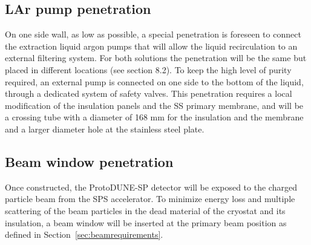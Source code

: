 \subsection{LAr pump penetration}

On one side wall, as low as possible, a special penetration is foreseen to connect the extraction liquid argon pumps that will allow the liquid recirculation to an external filtering system. For both solutions the penetration will be the same but placed in different locations (see section 8.2).
To keep the high level of purity required, an external pump is connected on one side to the bottom of the liquid, through a dedicated system of safety valves. This penetration requires a local modification of the insulation panels and the SS primary membrane, and will be a crossing tube with a diameter of 168 mm for the insulation and the membrane and a larger diameter hole at the stainless steel plate.

\subsection{Beam window penetration}
\label{subsec:beamwindow}
Once constructed, the ProtoDUNE-SP detector will be exposed to the charged
particle beam from the SPS accelerator. To minimize energy loss and
multiple scattering of the beam particles in the dead material of the
cryostat and its insulation, a beam window will be inserted at the primary beam position as defined  in Section~\ref{sec:beamrequirements}. 

